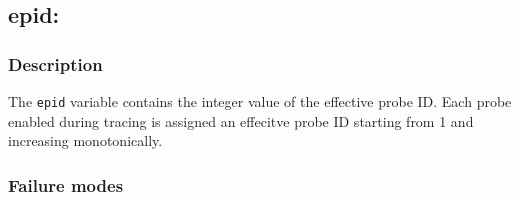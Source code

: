 \clearpage
{}
{}
\label{vars:epid}
\subsection*{epid: }

\subsubsection*{Description}

The \verb|epid| variable contains the integer value of the effective
probe ID.  Each probe enabled during tracing is assigned an effecitve
probe ID starting from 1 and increasing monotonically.

\subsubsection*{Failure modes}

